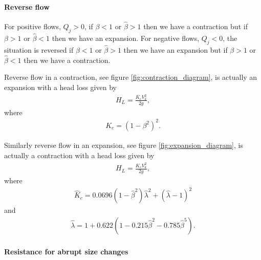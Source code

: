 \documentclass[12pt]{article}
\begin{document}
\paragraph{Reverse flow}

For positive flows, $Q_j > 0$, if $\beta < 1$ or $\hat{\beta} > 1$ then we have a contraction but if $\beta > 1$ or $\hat{\beta} < 1$ then we have an expansion. For negative flows, $Q_j < 0$, the situation is reversed if $\beta < 1$ or $\hat{\beta} > 1$ then we have an expansion but if $\beta > 1$ or $\hat{\beta} < 1$ then we have a contraction.

Reverse flow in a contraction, see figure \ref{fig:contraction_diagram}, is actually an expansion with a head loss given by
\begin{align}
H_L = \frac{K_e V_k^2}{2g},
\end{align}
where
\begin{align*}
K_e = \left(1 - \beta^2 \right)^2.
\end{align*}

Similarly reverse flow in an expansion, see figure \ref{fig:expansion_diagram}, is actually a contraction with a head loss given by
\begin{align}
H_L = \frac{\hat{K}_c V_k^2}{2g},
\end{align}
where 
\begin{align*}
\hat{K}_c = 0.0696 \left( 1 - \hat{\beta}^2 \right) \hat{\lambda}^2 + \left( \hat{\lambda} - 1 \right)^2
\end{align*}
and
\begin{align*}
\hat{\lambda} = 1 + 0.622 \left( 1 - 0.215 \hat{\beta}^2 - 0.785 \hat{\beta}^5 \right).
\end{align*}

\paragraph{Resistance for abrupt size changes}
\end{document}
